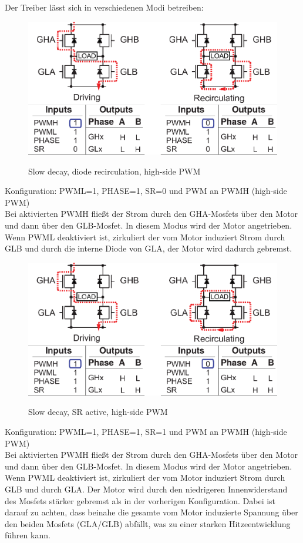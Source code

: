 Der Treiber lässt sich in verschiedenen Modi betreiben:

\begin{figure}[H]
\centering
\includegraphics[width=.8\textwidth]{3941_1.png}\\
\caption{Slow decay, diode recirculation, high-side PWM \cite{ds-A3941}}%
\label{fig:39411}
\end{figure}

Konfiguration: PWML=1, PHASE=1, SR=0 und PWM an PWMH (high-side PWM)\\
Bei aktivierten PWMH fließt der Strom durch den GHA-Mosfets über den Motor und
dann über den GLB-Mosfet. In diesem Modus wird der Motor angetrieben.
Wenn PWML deaktiviert ist, zirkuliert der vom Motor induziert Strom durch GLB und durch
die interne Diode von GLA, der Motor wird dadurch gebremst.


\begin{figure}[H]
\centering
\includegraphics[width=.8\textwidth]{3941_2.png}\\
\caption{Slow decay, SR active, high-side PWM \cite{ds-A3941}}%
\label{fig:39412}
\end{figure}

Konfiguration: PWML=1, PHASE=1, SR=1 und PWM an PWMH (high-side PWM)\\
Bei aktivierten PWMH fließt der Strom durch den GHA-Mosfets über den Motor und
dann über den GLB-Mosfet. In diesem Modus wird der Motor angetrieben.
Wenn PWML deaktiviert ist, zirkuliert der vom Motor induziert Strom durch 
GLB und durch GLA. Der Motor wird durch den niedrigeren Innenwiderstand des Mosfets 
stärker gebremst als in der vorherigen Konfiguration. Dabei ist darauf zu achten, dass
beinahe die gesamte vom Motor induzierte Spannung über den beiden Mosfets (GLA/GLB) abfällt,
was zu einer starken Hitzeentwicklung führen kann.



